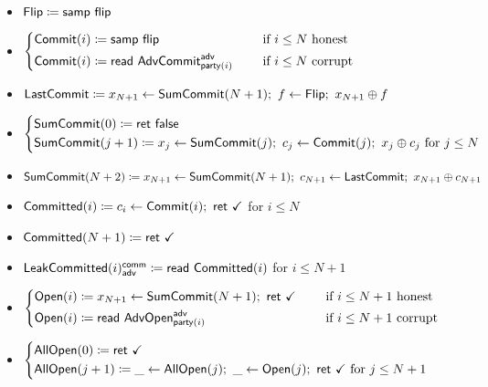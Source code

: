 \begin{itemize}
\item $\mathsf{Flip} \coloneqq \mathsf{samp} \ \mathsf{flip}$
\item {\color{blue} $\begin{cases*} \Commit(i) \coloneqq \samp{\flip} & \hspace{10pt} \text{if $i \leq N$ honest} \\ \Commit(i) \coloneqq \read{\AdvCommit^\adv_{\party(i)}} & \hspace{10pt} \text{if $i \leq N$ corrupt} \end{cases*}$}
\item {\color{blue} $\mathsf{LastCommit} \coloneqq x_{N+1} \leftarrow \mathsf{SumCommit}(N+1); \ f \leftarrow \mathsf{Flip}; \ x_{N+1} \oplus f$}
\item {\color{blue} $\begin{cases*} \SumCommit(0) \coloneqq \ret{\false} \\ \SumCommit(j+1) \coloneqq x_j \leftarrow \SumCommit(j); \ c_j \leftarrow \Commit(j); \ x_j \oplus c_j \text{ for $j \leq N$} \end{cases*}$}
\item {\color{blue} $\SumCommit(N+2) \coloneqq x_{N+1} \leftarrow \SumCommit(N+1); \ c_{N+1} \leftarrow \LastCommit; \ x_{N+1} \oplus c_{N+1}$}
\item {\color{magenta} $\mathsf{Committed}(i) \coloneqq c_i \leftarrow \mathsf{Commit}(i); \ \mathsf{ret} \ \checkmark$ for $i \leq N$}
\item {\color{magenta} $\mathsf{Committed}(N+1) \coloneqq \mathsf{ret} \ \checkmark$}
\item {\color{magenta} $\mathsf{LeakCommitted}(i)^{\mathsf{comm}}_{\mathsf{adv}} \coloneqq \mathsf{read} \ \mathsf{Committed}(i)$ for $i \leq N+1$}
\item {\color{teal} $\begin{cases*} \Open(i) \coloneqq x_{N+1} \leftarrow \SumCommit(N+1); \ \ret{\checkmark} & \hspace{10pt} \text{if $i \leq N+1$ honest} \\ \Open(i) \coloneqq \read{\AdvOpen^\adv_{\party(i)}} & \hspace{10pt} \text{if $i \leq N+1$ corrupt} \end{cases*}$}
\item {\color{teal} $\begin{cases*} \AllOpen(0) \coloneqq \ret{\checkmark} \\ \AllOpen(j+1) \coloneqq \_ \leftarrow \AllOpen(j); \ \_ \leftarrow \Open(j); \ \ret{\checkmark} \text{ for $j \leq N+1$} \end{cases*}$}

\end{itemize}
